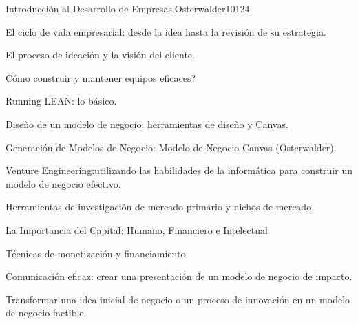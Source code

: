 \begin{syllabus}
\begin{unit}{Introducción al Desarrollo de Empresas.}{}{Osterwalder10}{12}{4}
   \begin{topics}
      \item El ciclo de vida empresarial: desde la idea hasta la revisión de su estrategia.
      \item El proceso de ideación y la visión del cliente.
      \item Cómo construir y mantener equipos eficaces?
      \item Running LEAN: lo básico.
      \item Diseño de un modelo de negocio: herramientas de diseño y Canvas.
      \item Generación de Modelos de Negocio: Modelo de Negocio Canvas (Osterwalder).
      \item Venture Engineering:utilizando las habilidades de la informática para construir un modelo de negocio efectivo.
      \item Herramientas de investigación de mercado primario y nichos de mercado.
      \item La Importancia del Capital: Humano, Financiero e Intelectual
      \item Técnicas de monetización y financiamiento.
      \item Comunicación eficaz: crear una presentación de un modelo de negocio de impacto.
   \end{topics}
   \begin{learningoutcomes}
      \item Transformar una idea inicial de negocio o un proceso de innovación en un modelo de negocio factible.
   \end{learningoutcomes}
\end{unit}



\begin{coursebibliography}
\end{coursebibliography}

\end{syllabus}
